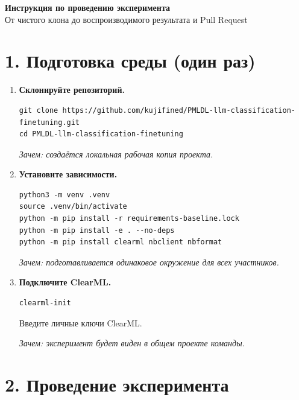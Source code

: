 \documentclass[a4paper,11pt]{article}
\newcommand{\step}[1]{\item \textcolor{accent}{\textbf{#1}}}
\newcommand{\why}[1]{\par\smallskip\textit{Зачем: #1}}
\begin{document}
\begin{center}
  {\Huge\bfseries\color{accent} Инструкция по проведению эксперимента}\\[0.45em]
  {\large От чистого клона до воспроизводимого результата и Pull Request}
\end{center}

\section*{1. Подготовка среды (один раз)}

\begin{enumerate}[leftmargin=*,itemsep=0.7em]
  \step{Склонируйте репозиторий.}
  \begin{lstlisting}[style=terminal]
git clone https://github.com/kujifined/PMLDL-llm-classification-finetuning.git
cd PMLDL-llm-classification-finetuning
  \end{lstlisting}
  \why{создаётся локальная рабочая копия проекта.}

  \step{Установите зависимости.}
  \begin{lstlisting}[style=terminal]
python3 -m venv .venv
source .venv/bin/activate
python -m pip install -r requirements-baseline.lock
python -m pip install -e . --no-deps
python -m pip install clearml nbclient nbformat
  \end{lstlisting}
  \why{подготавливается одинаковое окружение для всех участников.}

  \step{Подключите ClearML.}
  \begin{lstlisting}[style=terminal]
clearml-init
  \end{lstlisting}
  Введите личные ключи ClearML. \why{эксперимент будет виден в общем проекте команды.}
\end{enumerate}

\section*{2. Проведение эксперимента}
\end{document}
